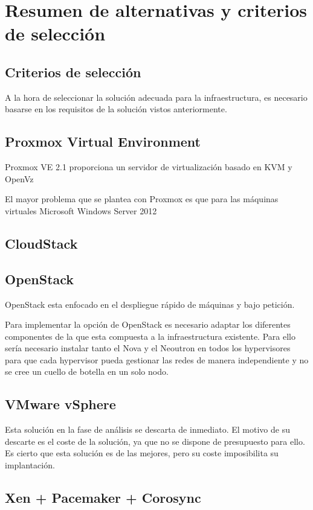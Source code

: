 \documentclass[12pt,a4paper,titlepage,twoside]{report}
\begin{document}
\chapter{Resumen de alternativas y criterios de selección}
\section{Criterios de selección}
A la hora de seleccionar la solución adecuada para la infraestructura, es necesario basarse en los requisitos de la solución vistos anteriormente.
\section{Proxmox Virtual Environment}
Proxmox VE 2.1 proporciona un servidor de virtualización basado en KVM y OpenVz

El mayor problema que se plantea con Proxmox es que para las máquinas virtuales Microsoft Windows Server 2012

\section{CloudStack}
\section{OpenStack}
OpenStack esta enfocado en el despliegue rápido de máquinas y bajo petición.

Para implementar la opción de OpenStack es necesario adaptar los diferentes componentes de la que esta compuesta a la infraestructura existente. Para ello sería necesario instalar tanto el Nova y el Neoutron en todos los hypervisores para que cada hypervisor pueda gestionar las redes de manera independiente y no se cree un cuello de botella en un solo nodo. 
\section{VMware vSphere}

Esta solución en la fase de análisis se descarta de inmediato. El motivo de su descarte es el coste de la solución, ya que no se dispone de presupuesto para ello. Es cierto que esta solución es de las mejores, pero su coste imposibilita su implantación.
\section{Xen + Pacemaker + Corosync}
\end{document}
